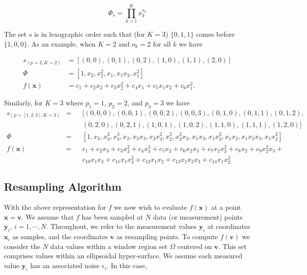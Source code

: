 \begin{equation}
    \Phi_s = \prod_{k = 1}^K x_k^{s_k}
    \label{eq:equation5}
\end{equation}

The set $s$ is in lexographic order such that (for $K=3$) $\{0,1,1\}$ comes
before $\{1, 0, 0\}$.
As an example, when $K=2$ and $o_k = 2$ for all $k$ we have

\begin{align}
    s_{(p=2,K=2)} &= [(0,0), (0,1), (0,2), (1,0), (1,1), (2,0)] \nonumber \\
    \Phi          &= [1, x_2, x_2^2, x_1, x_1 x_2, x_1^2] \nonumber \\
    f(\bm{x})     &= c_1 + c_2 x_2 + c_3 x_2^2 + c_4 x_1 +
                     c_5 x_1 x_2 + c_6 x_1^2. \nonumber
\end{align}

Similarly, for $K=3$ where $p_1 = 1$, $p_2 = 2$, and $p_3 = 3$ we have
\begin{align}
    s_{(p=[1,2,3],K=3)} &=&
        &[(0,0,0), (0,0,1), (0,0,2), (0,0,3), (0,1,0), (0,1,1), (0,1,2), \nonumber \\
        && &(0,2,0), (0,2,1), (1,0,1), (1,0,2), (1,1,0), (1,1,1), (1,2,0)] \nonumber \\
    \Phi &=&
        &[1, x_3, x_3^2, x_3^3, x_2, x_2 x_3, x_2 x_3^2, x_2^2, x_2^2 x_3,
         x_1 x_3, x_1 x_3^2, x_1 x_2, x_1 x_2 x_3, x_1 x_2^2] \nonumber \\
    f(\bm{x}) &=&
        &c_1 + c_2 x_3 + c_3 x_3^2 + c_4 x_3^3 + c_5 x_2 +
        c_6 x_2 x_3 + c_7 x_2 x_3^2 + c_8 x_2 + c_9 x_2^2 x_3 + \nonumber \\
        &&&c_{10} x_1 x_3 + c_{11} x_1 x_3^2 + c_{12} x_1 x_2 +
        c_{13} x_1 x_2 x_3 + c_{14} x_1 x_2^2 \nonumber
\end{align}

\subsection{Resampling Algorithm}\label{subsec:resampling-algorithm}

With the above representation for $f$ we now wish to evaluate $f(\bm{x})$ at a
point $\bm{x} = \bm{v}$.
We assume that $f$ has been sampled at $N$ data (or measurement) points
$\bm{y}_i$, $i = 1,\cdots,N$.
Throughout, we refer to the measurement values $\bm{y}_i$ at coordinates
$\bm{x}_i$ as samples, and the coordinates $\bm{v}$ as resampling points.
To compute $f(\bm{v})$ we consider the $N$ data values within a window region
set $\Omega$ centered on $\bm{v}$.
This set comprises values within an ellipsoidal hyper-surface.
We assume each measured value $\bm{y}_i$ has an associated noise $\epsilon_i$.
In this case,

